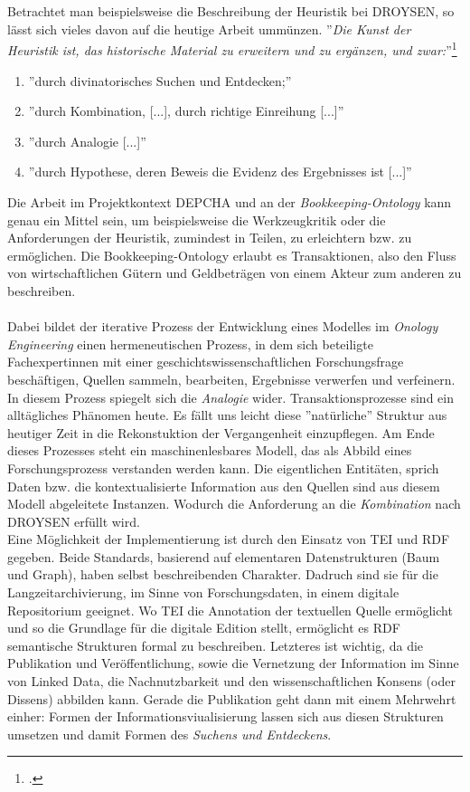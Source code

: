 \documentclass[12pt,a4paper]{article}
\begin{document}
\\
\\
Betrachtet man beispielsweise die Beschreibung der Heuristik bei DROYSEN, so lässt sich vieles davon auf die heutige Arbeit ummünzen. ''\textit{Die Kunst der Heuristik ist, das historische Material zu erweitern und zu ergänzen, und zwar:}''\footcite[][S.96]{hardtwig1990studium}
\begin{enumerate}[label=(\alph*)]
\item ''durch divinatorisches Suchen und Entdecken;'' 
\item ''durch Kombination, [...], durch richtige Einreihung [...]''
\item ''durch Analogie [...]'' 
\item ''durch Hypothese, deren Beweis die Evidenz des Ergebnisses ist [...]''
\end{enumerate}
Die Arbeit im Projektkontext DEPCHA und an der \textit{Bookkeeping-Ontology} kann genau ein Mittel sein, um beispielsweise die Werkzeugkritik oder die Anforderungen der Heuristik, zumindest in Teilen, zu erleichtern bzw. zu ermöglichen. Die Bookkeeping-Ontology erlaubt es Transaktionen, also den Fluss von wirtschaftlichen Gütern und Geldbeträgen von einem Akteur zum anderen zu beschreiben.
\\
\\
Dabei bildet der iterative Prozess der Entwicklung eines Modelles im \textit{Onology Engineering} einen hermeneutischen Prozess, in dem sich beteiligte Fachexpertinnen mit einer geschichtswissenschaftlichen Forschungsfrage beschäftigen, Quellen sammeln, bearbeiten, Ergebnisse verwerfen und verfeinern. In diesem Prozess spiegelt sich die \textit{Analogie} wider. Transaktionsprozesse sind ein alltägliches Phänomen heute. Es fällt uns leicht diese ''natürliche'' Struktur aus heutiger Zeit in die Rekonstuktion der Vergangenheit einzupflegen.  Am Ende dieses Prozesses steht ein maschinenlesbares Modell, das als Abbild eines Forschungsprozess verstanden werden kann. Die eigentlichen Entitäten, sprich Daten bzw. die kontextualisierte Information aus den Quellen sind aus diesem Modell abgeleitete Instanzen.
Wodurch die Anforderung an die \textit{Kombination} nach DROYSEN erfüllt wird.
\\
Eine Möglichkeit der Implementierung ist durch den Einsatz von TEI und RDF gegeben. Beide Standards, basierend auf elementaren Datenstrukturen (Baum und Graph), haben selbst beschreibenden Charakter. Dadruch sind sie für die Langzeitarchivierung, im Sinne von Forschungsdaten, in einem digitale Repositorium geeignet. Wo TEI die Annotation  der textuellen Quelle ermöglicht und so die Grundlage für die digitale Edition stellt, ermöglicht es RDF semantische Strukturen formal zu beschreiben. Letzteres ist wichtig, da die Publikation und Veröffentlichung, sowie die Vernetzung der Information im Sinne von Linked Data, die Nachnutzbarkeit und den wissenschaftlichen Konsens (oder Dissens) abbilden kann. Gerade die Publikation geht dann mit einem Mehrwehrt einher: Formen der Informationsviualisierung lassen sich aus diesen Strukturen umsetzen und damit Formen des \textit{Suchens und Entdeckens}.
\end{document}

